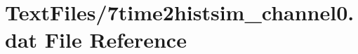 \hypertarget{7time2histsim__channel0_8dat}{}\section{Text\+Files/7time2histsim\+\_\+channel0.dat File Reference}
\label{7time2histsim__channel0_8dat}
